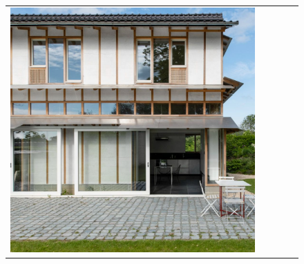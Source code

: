 \begin{figure}[H]
{\begin{tabular}{@{}ccccc@{}}
      \includegraphics[width=\linewidth]{Images/LoRAs/Modulariteit/Training_images/5.jpg} \\[2pt]


\end{tabular}}
\end{figure}
